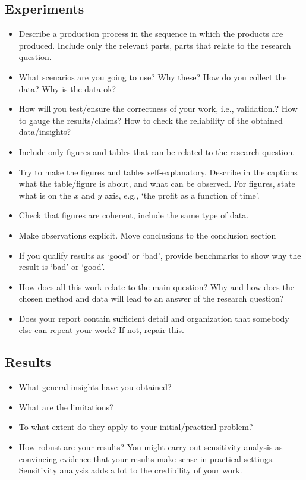 \documentclass{article}
\begin{document}
\subsection{Experiments}
\label{sec:experiments}


\begin{itemize}
\item Describe a production process in the sequence in which the
  products are produced. Include only the relevant parts, parts that
  relate to the research question.
\item What scenarios are you going to use? Why these? How do you
  collect the data? Why is the data ok?
\item How will you test/ensure the correctness of your work, i.e.,
  validation.? How to gauge the results/claims? How to check the
  reliability of the obtained data/insights?
\item Include only figures and tables that can be related to the
  research question.
\item Try to make the figures and tables self-explanatory. Describe in
  the captions what the table/figure is about, and what can be
  observed. For figures, state what is on the $x$ and $y$ axis, e.g.,
  `the profit as a function of time'.
\item Check that figures are coherent, include the same type of data.
\item Make observations explicit.  Move conclusions to the conclusion section
\item If you qualify results as `good' or `bad', provide benchmarks to
  show why the result is `bad' or `good'.
\item How does all this work relate to the main question? Why and how
  does the chosen method and data will lead to an answer of the
  research question?
\item Does your report contain sufficient detail and organization that
  somebody else can repeat your work? If not, repair this.
\end{itemize}


\subsection{Results}
\label{sec:results}

\begin{itemize}
\item What general insights have  you obtained?
\item What are the limitations?
\item To what extent do they apply to your initial/practical problem?
\item How robust are your results? You might carry out sensitivity
  analysis as convincing evidence that your results make sense in
  practical settings. Sensitivity analysis adds a lot to the
  credibility of your work.
\end{itemize}
\end{document}
